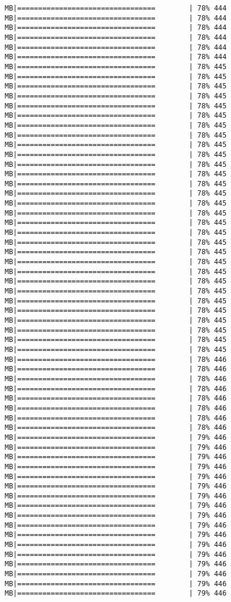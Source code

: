 \documentclass[
]{article}
\begin{document}
\begin{verbatim}
MB|=================================        | 78% 444 MB|=================================        | 78% 444 MB|=================================        | 78% 444 MB|=================================        | 78% 444 MB|=================================        | 78% 444 MB|=================================        | 78% 444 MB|=================================        | 78% 445 MB|=================================        | 78% 445 MB|=================================        | 78% 445 MB|=================================        | 78% 445 MB|=================================        | 78% 445 MB|=================================        | 78% 445 MB|=================================        | 78% 445 MB|=================================        | 78% 445 MB|=================================        | 78% 445 MB|=================================        | 78% 445 MB|=================================        | 78% 445 MB|=================================        | 78% 445 MB|=================================        | 78% 445 MB|=================================        | 78% 445 MB|=================================        | 78% 445 MB|=================================        | 78% 445 MB|=================================        | 78% 445 MB|=================================        | 78% 445 MB|=================================        | 78% 445 MB|=================================        | 78% 445 MB|=================================        | 78% 445 MB|=================================        | 78% 445 MB|=================================        | 78% 445 MB|=================================        | 78% 445 MB|=================================        | 78% 445 MB|=================================        | 78% 445 MB|=================================        | 78% 445 MB|=================================        | 78% 445 MB|=================================        | 78% 445 MB|=================================        | 78% 445 MB|=================================        | 78% 446 MB|=================================        | 78% 446 MB|=================================        | 78% 446 MB|=================================        | 78% 446 MB|=================================        | 78% 446 MB|=================================        | 78% 446 MB|=================================        | 78% 446 MB|=================================        | 78% 446 MB|=================================        | 79% 446 MB|=================================        | 79% 446 MB|=================================        | 79% 446 MB|=================================        | 79% 446 MB|=================================        | 79% 446 MB|=================================        | 79% 446 MB|=================================        | 79% 446 MB|=================================        | 79% 446 MB|=================================        | 79% 446 MB|=================================        | 79% 446 MB|=================================        | 79% 446 MB|=================================        | 79% 446 MB|=================================        | 79% 446 MB|=================================        | 79% 446 MB|=================================        | 79% 446 MB|=================================        | 79% 446 MB|=================================        | 79% 446 
\end{verbatim}
\end{document}
